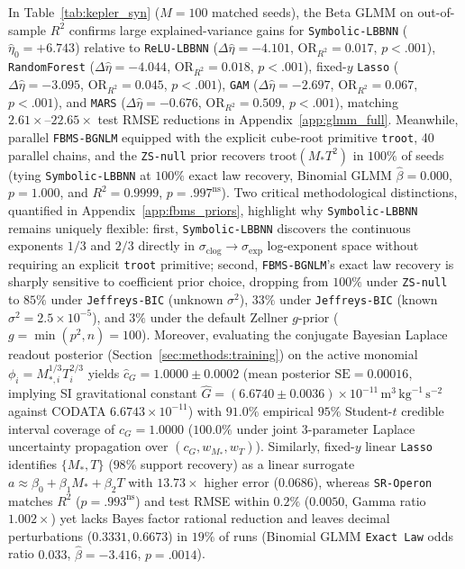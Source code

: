 \documentclass[11pt,a4paper]{article}
\begin{document}
In Table~\ref{tab:kepler_syn} ($M = 100$ matched seeds), the Beta GLMM on out-of-sample $R^2$ confirms large explained-variance gains for \texttt{Symbolic-LBBNN} ($\hat{\eta}_0 = +6.743$) relative to \texttt{ReLU-LBBNN} ($\Delta\hat{\eta} = -4.101$, $\mathrm{OR}_{R^2} = 0.017$, $p < .001$), \texttt{RandomForest} ($\Delta\hat{\eta} = -4.044$, $\mathrm{OR}_{R^2} = 0.018$, $p < .001$), fixed-$y$ \texttt{Lasso} ($\Delta\hat{\eta} = -3.095$, $\mathrm{OR}_{R^2} = 0.045$, $p < .001$), \texttt{GAM} ($\Delta\hat{\eta} = -2.697$, $\mathrm{OR}_{R^2} = 0.067$, $p < .001$), and \texttt{MARS} ($\Delta\hat{\eta} = -0.676$, $\mathrm{OR}_{R^2} = 0.509$, $p < .001$), matching $2.61\times\text{--}22.65\times$ test RMSE reductions in Appendix~\ref{app:glmm_full}. Meanwhile, parallel \texttt{FBMS-BGNLM} equipped with the explicit cube-root primitive \texttt{troot}, 40 parallel chains, and the \texttt{ZS-null} prior recovers $\mathrm{troot}(M_* T^2)$ in $100\%$ of seeds (tying \texttt{Symbolic-LBBNN} at $100\%$ exact law recovery, Binomial GLMM $\hat{\beta} = 0.000$, $p = 1.000$, and $R^2 = 0.9999$, $p = .997^{\text{ns}}$). Two critical methodological distinctions, quantified in Appendix~\ref{app:fbms_priors}, highlight why \texttt{Symbolic-LBBNN} remains uniquely flexible: first, \texttt{Symbolic-LBBNN} discovers the continuous exponents $1/3$ and $2/3$ directly in $\sigma_{\text{clog}} \to \sigma_{\exp}$ log-exponent space without requiring an explicit \texttt{troot} primitive; second, \texttt{FBMS-BGNLM}'s exact law recovery is sharply sensitive to coefficient prior choice, dropping from $100\%$ under \texttt{ZS-null} to $85\%$ under \texttt{Jeffreys-BIC} (unknown $\sigma^2$), $33\%$ under \texttt{Jeffreys-BIC} (known $\sigma^2 = 2.5\times 10^{-5}$), and $3\%$ under the default Zellner $g$-prior ($g = \min(p^2, n) = 100$). Moreover, evaluating the conjugate Bayesian Laplace readout posterior (Section~\ref{sec:methods:training}) on the active monomial $\phi_i = M_{*,i}^{1/3} T_i^{2/3}$ yields $\hat{c}_G = 1.0000 \pm 0.0002$ (mean posterior $\mathrm{SE} = 0.00016$, implying SI gravitational constant $\hat{G} = (6.6740 \pm 0.0036) \times 10^{-11}\,\text{m}^3\,\text{kg}^{-1}\,\text{s}^{-2}$ against CODATA $6.6743 \times 10^{-11}$) with $91.0\%$ empirical $95\%$ Student-$t$ credible interval coverage of $c_G = 1.0000$ ($100.0\%$ under joint $3$-parameter Laplace uncertainty propagation over $(c_G, w_{M_*}, w_T)$). Similarly, fixed-$y$ linear \texttt{Lasso} identifies $\{M_*, T\}$ ($98\%$ support recovery) as a linear surrogate $a \approx \beta_0 + \beta_1 M_* + \beta_2 T$ with $13.73\times$ higher error ($0.0686$), whereas \texttt{SR-Operon} matches $R^2$ ($p = .993^{\text{ns}}$) and test RMSE within $0.2\%$ ($0.0050$, Gamma ratio $1.002\times$) yet lacks Bayes factor rational reduction and leaves decimal perturbations ($0.3331, 0.6673$) in $19\%$ of runs (Binomial GLMM \texttt{Exact Law} odds ratio $0.033$, $\hat{\beta} = -3.416$, $p = .0014$).
\end{document}
